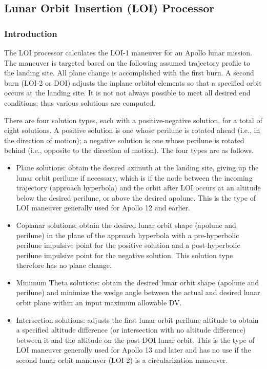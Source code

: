 \documentclass[11pt]{article} %
\begin{document}
\subsection{Lunar Orbit Insertion (LOI) Processor}

\subsubsection{Introduction}

The LOI processor calculates the LOI-1 maneuver for an Apollo lunar mission. The maneuver is targeted based on the following assumed trajectory profile to the landing site. All plane change is accomplished with the first burn. A second burn (LOI-2 or DOI) adjusts the inplane orbital elements so that a specified orbit occurs at the landing site. It is not not always possible to meet all desired end conditions; thus various solutions are computed.

There are four solution types, each with a positive-negative solution, for a total of eight solutions. A positive solution is one whose perilune is rotated ahead (i.e., in the direction of motion); a negative solution is one whose perilune is rotated behind (i.e., opposite to the direction of motion). The four types are as follows.

\begin{itemize}
	\item Plane solutions: obtain the desired azimuth at the landing site, giving up the lunar orbit perilune if necessary, which is if the node between the incoming trajectory (approach hyperbola) and the orbit after LOI occurs at an altitude below the desired perilune, or above the desired apolune. This is the type of LOI maneuver generally used for Apollo 12 and earlier.
\item Coplanar solutions: obtain the desired lunar orbit shape (apolune and perilune) in the plane of the approach hyperbola with a pre-hyperbolic perilune impulsive point for the positive solution and a post-hyperbolic perilune impulsive point for the negative solution. This solution type therefore has no plane change.
\item Minimum Theta solutions: obtain the desired lunar orbit shape (apolune and perilune) and minimize the wedge angle between the actual and desired lunar orbit plane within an input maximum allowable DV.
\item Intersection solutions: adjusts the first lunar orbit perilune altitude to obtain a specified altitude difference (or intersection with no altitude difference) between it and the altitude on the post-DOI lunar orbit. This is the type of LOI maneuver generally used for Apollo 13 and later and has no use if the second lunar orbit maneuver (LOI-2) is a circularization maneuver.
\end{itemize}
\end{document}
